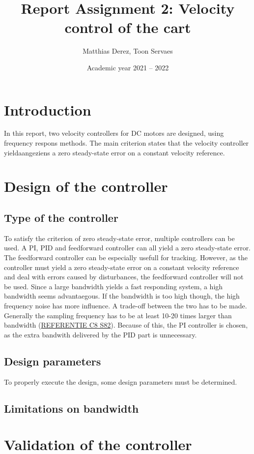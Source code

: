 \documentclass[a4paper,kul]{kulakarticle} %
\date{Academic year 2021 -- 2022}
\title{Report Assignment 2: Velocity control of the cart}
\author{Matthias Derez, Toon Servaes}
\begin{document}
\maketitle
\section{Introduction}
In this report, two velocity controllers for DC motors are designed, using frequency respons methods. The main criterion states that the velocity controller yieldaangeziens a zero steady-state error on a constant velocity reference. 
\section{Design of the controller}
\subsection{Type of the controller}
To satisfy the criterion of zero steady-state error, multiple controllers can be used. A PI, PID and feedforward controller can all yield a zero steady-state error. The feedforward controller can be especially usefull for tracking. However, as the controller must yield a zero steady-state error on a constant velocity reference and deal with errors caused by disturbances, the feedforward controller will not be used. Since a large bandwidth yields a fast responding system, a high bandwidth seems advantaegous. If the bandwidth is too high though, the high frequency noise has more influence. A trade-off between the two has to be made. Generally the sampling frequency has to be at least 10-20 times larger than bandwidth (\underline{REFERENTIE C8 S82}). Because of this, the PI controller is chosen, as the extra bandwith delivered by the PID part is unnecessary.  
\subsection{Design parameters}
To properly execute the design, some design parameters must be determined. 
\subsection{Limitations on bandwidth}

\section{Validation of the controller}
\end{document}
